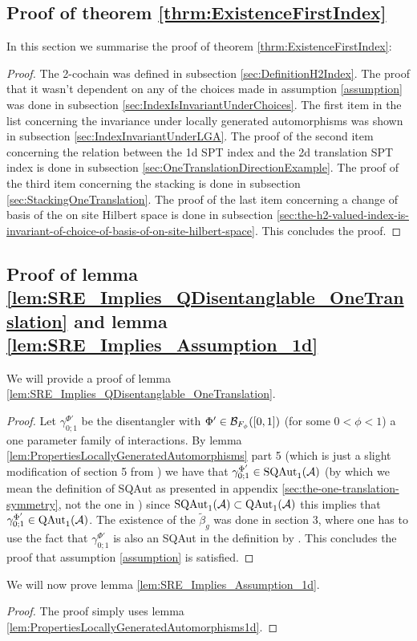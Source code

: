 \documentclass[11pt,a4paper,twoside]{article}
\numberwithin{equation}{section}
\begin{document}
\subsection{Proof of theorem \ref{thrm:ExistenceFirstIndex}}\label{sec:ProofOf:thrm:ExistenceFirstIndex}
In this section we summarise the proof of theorem \ref{thrm:ExistenceFirstIndex}:
\begin{proof}
	The 2-cochain was defined in subsection \ref{sec:DefinitionH2Index}. The proof that it wasn't dependent on any of the choices made in assumption \ref{assumption} was done in subsection \ref{sec:IndexIsInvariantUnderChoices}. The first item in the list concerning the invariance under locally generated automorphisms was shown in subsection \ref{sec:IndexInvariantUnderLGA}. The proof of the second item concerning the relation between the 1d SPT index and the 2d translation SPT index is done in subsection \ref{sec:OneTranslationDirectionExample}. The proof of the third item concerning the stacking is done in subsection \ref{sec:StackingOneTranslation}. The proof of the last item concerning a change of basis of the on site Hilbert space is done in subsection \ref{sec:the-h2-valued-index-is-invariant-of-choice-of-basis-of-on-site-hilbert-space}. This concludes the proof.
\end{proof}
\subsection{Proof of lemma \ref{lem:SRE_Implies_QDisentanglable_OneTranslation} and lemma \ref{lem:SRE_Implies_Assumption_1d}}\label{sec:ProofOfMainResult1}
We will provide a proof of lemma \ref{lem:SRE_Implies_QDisentanglable_OneTranslation}.
\begin{proof}
	Let $\gamma^{\Phi'}_{0;1}$ be the disentangler with $\Phi'\in\BB_{F_\phi}([0,1])$ (for some $0<\phi<1$) a one parameter family of interactions. By lemma \ref{lem:PropertiesLocallyGeneratedAutomorphisms} part 5 (which is just a slight modification of section 5 from \cite{ogata2021h3gmathbb}) we have that $\gamma^{\Phi'}_{0;1}\in\textrm{SQAut}_1(\AA)$ (by which we mean the definition of SQAut as presented in appendix \ref{sec:the-one-translation-symmetry}, not the one in \cite{ogata2021h3gmathbb}) since $\textrm{SQAut}_1(\AA)\subset\QAut{\AA}$ this implies that $\gamma^{\Phi'}_{0;1}\in\QAut{\AA}$. The existence of the $\tilde{\beta}_g$ was done in \cite{ogata2021h3gmathbb} section 3, where one has to use the fact that $\gamma^{\Phi'}_{0;1}$ is also an SQAut in the definition by \cite{ogata2021h3gmathbb}. This concludes the proof that assumption \ref{assumption} is satisfied.
\end{proof}
We will now prove lemma \ref{lem:SRE_Implies_Assumption_1d}.
\begin{proof}
	The proof simply uses lemma \ref{lem:PropertiesLocallyGeneratedAutomorphisms1d}.
\end{proof}
\end{document}
